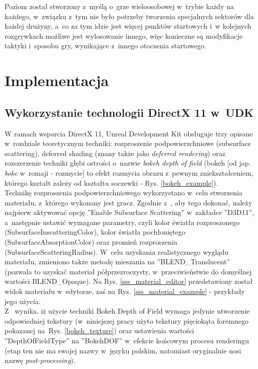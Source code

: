Poziom został stworzony z~myślą o~grze wieloosobowej w~trybie każdy na każdego, w~związku z~tym nie było potrzeby tworzenia specjalnych sektorów dla każdej drużyny, a~co za tym idzie jest więcej punktów startowych i~w kolejnych rozgrywkach możliwe jest wylosowanie innego, więc konieczne są modyfikacje taktyki i~sposobu gry, wynikające z~innego otoczenia startowego.

\section{Implementacja}

\subsection{Wykorzystanie technologii DirectX 11 w~UDK}

W ramach wsparcia DirectX 11, Unreal Development Kit obsługuje trzy opisane w~rozdziale teoretycznym techniki: rozproszenie podpowierzchniowe (subsurface scattering), deferred shading (znany także jako \emph{deferred rendering}) oraz rozszerzenie techniki głębi ostrości o~nazwie \emph{bokeh depth of field} (bokeh [od jap. \emph{boke} w~romaji - rozmycie] to efekt rozmycia obrazu z~pewnym zniekształceniem, którego kształt zależy od kształtu soczewki - Rys. \ref{bokeh_example}).\\

Technikę rozproszenia podpowierzchniowego wykorzystano w~celu stworzenia materiału, z~którego wykonany jest gracz. Zgodnie z~\cite{udk_sss}, aby tego dokonać, należy najpierw aktywować opcję ''Enable Subsurface Scattering'' w~zakładce ''D3D11'', a~następnie ustawić wymagane parametry, czyli kolor światła rozproszonego (SubsurfaceInscatteringColor), kolor światła pochłoniętego (SubsurfaceAbsorptionColor) oraz promień rozproszenia (SubsurfaceScatteringRadius). W~celu uzyskania realistycznego wyglądu materiału, zmieniono także metodę mieszania na ''BLEND\_Translucent'' (pozwala to uzyskać materiał półprzezroczysty, w~przeciwieństwie do domyślnej wartości BLEND\_Opaque). Na Rys. \ref{sss_material_editor} przedstawiony został widok materiału w~edytorze, zaś na Rys. \ref{sss_material_example} - przykłady jego użycia.\\

Z~\cite{udk_bokeh_dof} wynika, iż użycie techniki Bokeh Depth of Field wymaga jedynie utworzenie odpowiedniej tekstury (w~niniejszej pracy użyto tekstury pięciokąta foremnego pokazanej na~Rys. \ref{bokeh_texture}) oraz ustawienia wartości ''DepthOfFieldType'' na ''BokehDOF'' w~efekcie końcowym procesu renderingu (etap ten nie ma swojej nazwy w~języku polskim, natomiast oryginalnie nosi nazwę \emph{post-processing}).\\

